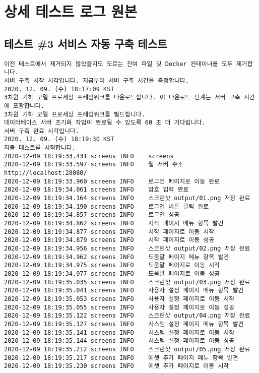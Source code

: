\chapter{상세 테스트 로그 원본}

\section{테스트 \#3 서비스 자동 구축 테스트}
\begin{Verbatim}[fontsize=\tiny, breaklines=true, breakanywhere=true]
이전 테스트에서 제거되지 않았을지도 모르는 잔여 파일 및 Docker 컨테이너를 모두 제거합니다.
서버 구축 시작 시각입니다. 지금부터 서버 구축 시간을 측정합니다.
2020. 12. 09. (수) 18:17:09 KST
3차원 기하 모델 프로세싱 프레임워크를 다운로드합니다. 이 다운로드 단계는 서버 구축 시간에 포함합니다.
3차원 기하 모델 프로세싱 프레임워크를 빌드합니다.
데이터베이스 서버 초기화 작업이 완료될 수 있도록 60 초 더 기다립니다.
서버 구축 완료 시각입니다.
2020. 12. 09. (수) 18:19:30 KST
자동 테스트를 시작합니다.
2020-12-09 18:19:33.431 screens	INFO	screens
2020-12-09 18:19:33.597 screens	INFO	웹 서버 주소 http://localhost:28080/
2020-12-09 18:19:33.960 screens	INFO	로그인 페이지로 이동 완료
2020-12-09 18:19:34.061 screens	INFO	암호 입력 완료
2020-12-09 18:19:34.164 screens	INFO	스크린샷 output/01.png 저장 완료
2020-12-09 18:19:34.190 screens	INFO	로그인 버튼 클릭 완료
2020-12-09 18:19:34.857 screens	INFO	로그인 성공
2020-12-09 18:19:34.862 screens	INFO	시작 페이지 메뉴 항목 발견
2020-12-09 18:19:34.877 screens	INFO	시작 페이지로 이동 시작
2020-12-09 18:19:34.879 screens	INFO	시작 페이지로 이동 성공
2020-12-09 18:19:34.956 screens	INFO	스크린샷 output/02.png 저장 완료
2020-12-09 18:19:34.962 screens	INFO	도움말 페이지 메뉴 항목 발견
2020-12-09 18:19:34.975 screens	INFO	도움말 페이지로 이동 시작
2020-12-09 18:19:34.977 screens	INFO	도움말 페이지로 이동 성공
2020-12-09 18:19:35.035 screens	INFO	스크린샷 output/03.png 저장 완료
2020-12-09 18:19:35.041 screens	INFO	사용자 설정 페이지 메뉴 항목 발견
2020-12-09 18:19:35.053 screens	INFO	사용자 설정 페이지로 이동 시작
2020-12-09 18:19:35.055 screens	INFO	사용자 설정 페이지로 이동 성공
2020-12-09 18:19:35.122 screens	INFO	스크린샷 output/04.png 저장 완료
2020-12-09 18:19:35.127 screens	INFO	시스템 설정 페이지 메뉴 항목 발견
2020-12-09 18:19:35.141 screens	INFO	시스템 설정 페이지로 이동 시작
2020-12-09 18:19:35.144 screens	INFO	시스템 설정 페이지로 이동 성공
2020-12-09 18:19:35.212 screens	INFO	스크린샷 output/05.png 저장 완료
2020-12-09 18:19:35.217 screens	INFO	에셋 추가 페이지 메뉴 항목 발견
2020-12-09 18:19:35.230 screens	INFO	에셋 추가 페이지로 이동 시작

\end{Verbatim}
